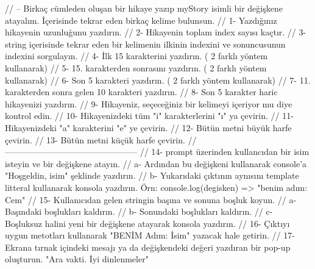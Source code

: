 // -- Birkaç cümleden oluşan bir hikaye yazıp myStory isimli bir değişkene atayalım. İçerisinde tekrar eden birkaç kelime bulunsun.
// 1- Yazdığınız hikayenin uzunluğunu yazdırın.
// 2- Hikayenin toplam index sayısı kaçtır.
// 3- string içerisinde tekrar eden bir kelimenin ilkinin indexini ve sonuncusunun indexini sorgulayın.
// 4- İlk 15 karakterini yazdırın. ( 2 farklı yöntem kullanarak)
// 5- 15. karakterden sonrasını yazdırın. ( 2 farklı yöntem kullanarak)
// 6- Son 5 karakteri yazdırın. ( 2 farklı yöntem kullanarak)
// 7- 11. karakterden sonra gelen 10 karakteri yazdırın.
// 8- Son 5 karakter haric hikayenizi yazdırın.
// 9- Hikayeniz, seçeceğiniz bir kelimeyi içeriyor mu diye kontrol edin.
// 10- Hikayenizdeki tüm "i" karakterlerini "ı" ya çevirin.
// 11- Hikayenizdeki "a" karakterini "e" ye çevirin.
// 12- Bütün metni büyük harfe çevirin.
// 13- Bütün metni küçük harfe çevirin.
// -----------------------------------------------
// 14- prompt üzerinden kullancıdan bir isim isteyin ve bir değişkene atayın.
//   a- Ardından bu değişkeni kullanarak console'a "Hoşgeldin, isim" şeklinde yazdırın.
//   b- Yukarıdaki çıktının aynısını template litteral kullanarak konsola yazdırın. Örn: console.log(degisken) => "benim adım: Cem"  
// 15- Kullanıcıdan gelen stringin başına ve sonuna boşluk koyun. 
//   a- Başındaki boşlukları kaldırın.
//   b- Sonundaki boşlukları kaldırın.
//   c- Boşluksuz halini yeni bir değişkene atayarak konsola yazdırın.
// 16- Çıktıyı uygun metotları kullanarak "BENİM Adım: İsim" yazacak hale getirin.
// 17- Ekrana tırnak içindeki mesajı ya da değişkendeki değeri yazdıran bir pop-up oluşturun. "Ara vakti. İyi dinlenmeler"
